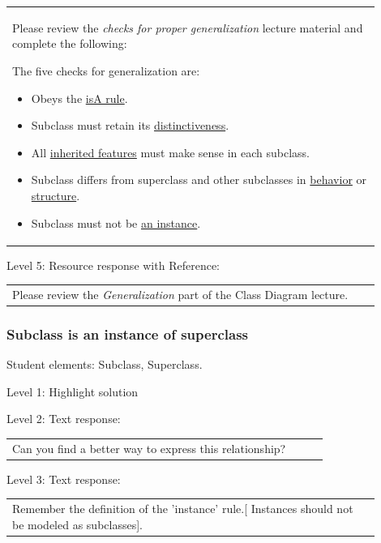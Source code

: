 \begin{tabular}{|p{0.9\linewidth}}

Please review the \textit{checks for proper generalization} lecture material
and complete the following:

The five checks for generalization are:

\begin{itemize}
    \item Obeys the \underline{isA rule}.
    \item Subclass must retain its \underline{distinctiveness}.
    \item All \underline{inherited features} must make sense in each subclass.
    \item Subclass differs from superclass and other subclasses in \underline{behavior} or \underline{structure}.
    \item Subclass must not be \underline{an instance}.
\end{itemize}

\end{tabular} \medskip

\noindent Level 5: Resource response with Reference: \medskip

\begin{tabular}{|p{0.9\linewidth}}
Please review the \textit{Generalization} part of the Class Diagram lecture.
\end{tabular} \medskip


\subsubsection{Subclass is an instance of superclass}

Student elements: Subclass, Superclass.  \medskip

\noindent Level 1: Highlight solution  \medskip

\noindent Level 2: Text response: \medskip

\begin{tabular}{|p{0.9\linewidth}}
Can you find a better way to express this relationship?
\end{tabular} \medskip

\noindent Level 3: Text response: \medskip

\begin{tabular}{|p{0.9\linewidth}}
Remember the definition of the 'instance' rule.[ Instances should not be modeled as subclasses].
\end{tabular} \medskip

